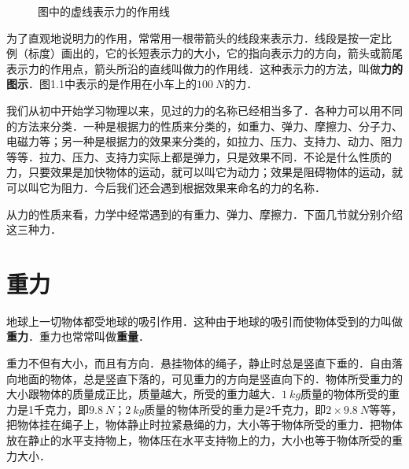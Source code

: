 \begin{wrapfigure}[6]{r}{6cm}
    \vspace*{-1.5em}
    \centering
    \caption{图中的虚线表示力的作用线}
\end{wrapfigure}
为了直观地说明力的作用，常常用一根带箭头的线段来表示力．线段是按一定比
例（标度）画出的，它的长短表示力的大小，它的指向表示力的方向，箭头或箭尾表示力的作用点，箭头所沿的直线叫做力的作用线．这种表示力的方法，叫做\textbf{力的图示}．图1.1中表示的是作用在小车上的$\qty{100}{N}$的力．

我们从初中开始学习物理以来，见过的力的名称已经相当多了．各种力可以用不同的方法来分类．一种是根据力的性质来分类的，如重力、弹力、摩擦力、分子力、电磁力等；另一种是根据力的效果来分类的，如拉力、压力、支持力、动力、阻力等等．拉力、压力、支持力实际上都是弹力，只是效果不同．不论是什么性质的力，只要效果是加快物体的运动，就可以叫它为动力；效果是阻碍物体的运动，就可以叫它为阻力．今后我们还会遇到根据效果来命名的力的名称．

从力的性质来看，力学中经常遇到的有重力、弹力、摩擦力．下面几节就分别介绍这三种力．
\newpage

\section{重力}

地球上一切物体都受地球的吸引作用．这种由于地球的吸引而使物体受到的力叫做\textbf{重力}．重力也常常叫做\textbf{重量}．

重力不但有大小，而且有方向．悬挂物体的绳子，静止时总是竖直下垂的．自由落向地面的物体，总是竖直下落的，可见重力的方向是竖直向下的．物体所受重力的大小跟物体的质量成正比，质量越大，所受的重力越大．$\qty{1}{kg}$质量的物体所受的重力是1千克力，即$\qty{9.8}{N}$；$\qty{2}{kg}$质量的物体所受的重力是2千克力，即$2\times \qty{9.8}{N}$等等，把物体挂在绳子上，物体静止时拉紧悬绳的力，大小等于物体所受的重力．把物体放在静止的水平支持物上，物体压在水平支持物上的力，大小也等于物体所受的重力大小．

